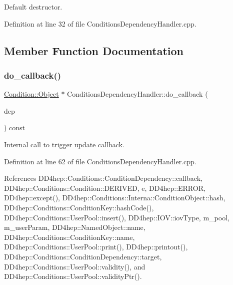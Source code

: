 Default destructor. 



Definition at line 32 of file Conditions\+Dependency\+Handler.\+cpp.



\subsection{Member Function Documentation}
\hypertarget{class_d_d4hep_1_1_conditions_1_1_conditions_dependency_handler_a62fd1c8dd9f47cd555f8d96f78b6e1c5}{}\label{class_d_d4hep_1_1_conditions_1_1_conditions_dependency_handler_a62fd1c8dd9f47cd555f8d96f78b6e1c5} 
\subsubsection{\texorpdfstring{do\+\_\+callback()}{do\_callback()}}
{\footnotesize\ttfamily \hyperlink{class_d_d4hep_1_1_conditions_1_1_condition_a6fc8dae0dad41db6a237920c85f8a55d}{Condition\+::\+Object} $\ast$ Conditions\+Dependency\+Handler\+::do\+\_\+callback (\begin{DoxyParamCaption}\item[{const \hyperlink{class_d_d4hep_1_1_conditions_1_1_condition_dependency}{Condition\+Dependency} \&}]{dep }\end{DoxyParamCaption}) const\hspace{0.3cm}{\ttfamily [protected]}}



Internal call to trigger update callback. 



Definition at line 62 of file Conditions\+Dependency\+Handler.\+cpp.



References D\+D4hep\+::\+Conditions\+::\+Condition\+Dependency\+::callback, D\+D4hep\+::\+Conditions\+::\+Condition\+::\+D\+E\+R\+I\+V\+ED, e, D\+D4hep\+::\+E\+R\+R\+OR, D\+D4hep\+::except(), D\+D4hep\+::\+Conditions\+::\+Interna\+::\+Condition\+Object\+::hash, D\+D4hep\+::\+Conditions\+::\+Condition\+Key\+::hash\+Code(), D\+D4hep\+::\+Conditions\+::\+User\+Pool\+::insert(), D\+D4hep\+::\+I\+O\+V\+::iov\+Type, m\+\_\+pool, m\+\_\+user\+Param, D\+D4hep\+::\+Named\+Object\+::name, D\+D4hep\+::\+Conditions\+::\+Condition\+Key\+::name, D\+D4hep\+::\+Conditions\+::\+User\+Pool\+::print(), D\+D4hep\+::printout(), D\+D4hep\+::\+Conditions\+::\+Condition\+Dependency\+::target, D\+D4hep\+::\+Conditions\+::\+User\+Pool\+::validity(), and D\+D4hep\+::\+Conditions\+::\+User\+Pool\+::validity\+Ptr().




